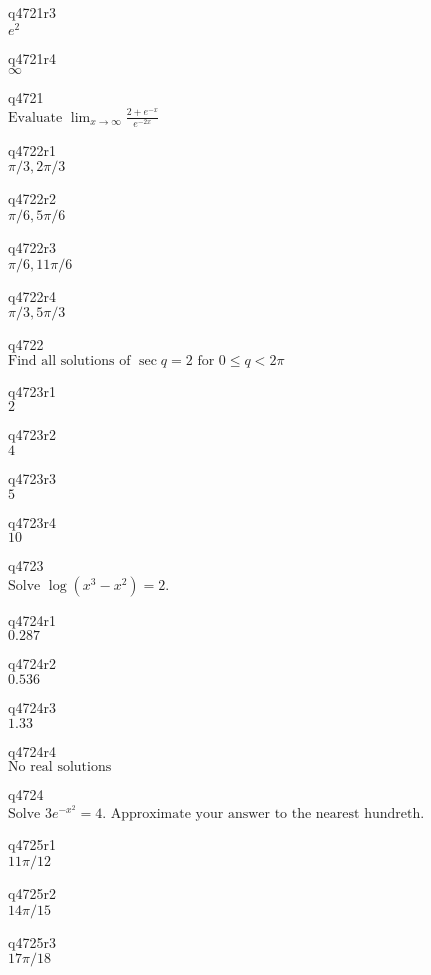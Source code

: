 q4721r3\\
\(\displaystyle e^2 \)

q4721r4\\
\(\displaystyle \infty \)

q4721\\
\(\displaystyle \text{Evaluate } \lim_{x \rightarrow \infty} \frac{2+e^{-x}}{e^{-2x}} \)

q4722r1\\
\(\displaystyle \pi/3, 2\pi/3 \)

q4722r2\\
\(\displaystyle \pi/6, 5\pi/6 \)

q4722r3\\
\(\displaystyle \pi/6, 11\pi/6 \)

q4722r4\\
\(\displaystyle \pi/3, 5\pi/3 \)

q4722\\
\(\displaystyle \text{Find all solutions of } \sec q = 2 \text{ for } 0 \leq q < 2\pi \)

q4723r1\\
\(\displaystyle 2 \)

q4723r2\\
\(\displaystyle 4 \)

q4723r3\\
\(\displaystyle 5 \)

q4723r4\\
\(\displaystyle 10 \)

q4723\\
\(\displaystyle \text{Solve } \log(x^3 - x^2) = 2. \)

q4724r1\\
\(\displaystyle 0.287 \)

q4724r2\\
\(\displaystyle 0.536 \)

q4724r3\\
\(\displaystyle 1.33 \)

q4724r4\\
\(\displaystyle \text{No real solutions} \)

q4724\\
\(\displaystyle \text{Solve } 3e^{-x^2} = 4. \text{ Approximate your answer to the nearest hundreth.} \)

q4725r1\\
\(\displaystyle 11\pi/12 \)

q4725r2\\
\(\displaystyle 14\pi/15 \)

q4725r3\\
\(\displaystyle 17\pi/18 \)

